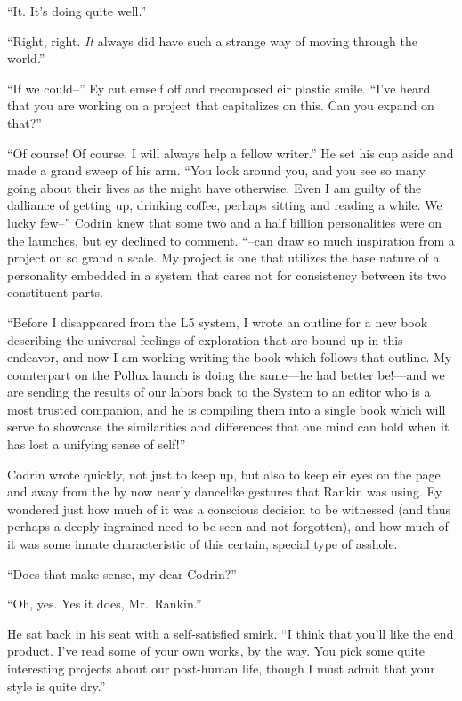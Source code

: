 ``It. It's doing quite well.''

``Right, right. \emph{It} always did have such a strange way of moving through the world.''

``If we could--'' Ey cut emself off and recomposed eir plastic smile. ``I've heard that you are working on a project that capitalizes on this. Can you expand on that?''

``Of course! Of course. I will always help a fellow writer.'' He set his cup aside and made a grand sweep of his arm. ``You look around you, and you see so many going about their lives as the might have otherwise. Even I am guilty of the dalliance of getting up, drinking coffee, perhaps sitting and reading a while. We lucky few--'' Codrin knew that some two and a half billion personalities were on the launches, but ey declined to comment. ``--can draw so much inspiration from a project on so grand a scale. My project is one that utilizes the base nature of a personality embedded in a system that cares not for consistency between its two constituent parts.

``Before I disappeared from the L5 system, I wrote an outline for a new book describing the universal feelings of exploration that are bound up in this endeavor, and now I am working writing the book which follows that outline. My counterpart on the Pollux launch is doing the same---he had better be!---and we are sending the results of our labors back to the System to an editor who is a most trusted companion, and he is compiling them into a single book which will serve to showcase the similarities and differences that one mind can hold when it has lost a unifying sense of self!''

Codrin wrote quickly, not just to keep up, but also to keep eir eyes on the page and away from the by now nearly dancelike gestures that Rankin was using. Ey wondered just how much of it was a conscious decision to be witnessed (and thus perhaps a deeply ingrained need to be seen and not forgotten), and how much of it was some innate characteristic of this certain, special type of asshole.

``Does that make sense, my dear Codrin?''

``Oh, yes. Yes it does, Mr.~Rankin.''

He sat back in his seat with a self-satisfied smirk. ``I think that you'll like the end product. I've read some of your own works, by the way. You pick some quite interesting projects about our post-human life, though I must admit that your style is quite dry.''

